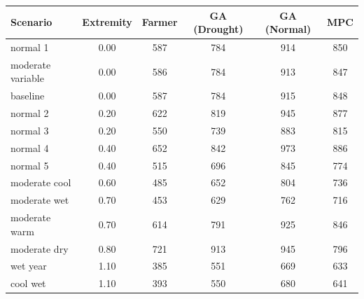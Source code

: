 \documentclass[preprint,12pt]{elsarticle}
\begin{document}

\begin{table}[ht]
\centering
\small
\begin{tabular}{|l|c|c|c|c|c|}
\hline
Scenario & Extremity & Farmer & GA (Drought) & GA (Normal) & MPC \\
\hline\hline
normal 1             & 0.00 & \cellcolor{c2}587 & \cellcolor{c4}784 & \cellcolor{c6}914 & \cellcolor{c5}850 \\
moderate variable    & 0.00 & \cellcolor{c2}586 & \cellcolor{c4}784 & \cellcolor{c6}913 & \cellcolor{c5}847 \\
baseline             & 0.00 & \cellcolor{c2}587 & \cellcolor{c4}784 & \cellcolor{c6}915 & \cellcolor{c5}848 \\
normal 2             & 0.20 & \cellcolor{c3}622 & \cellcolor{c5}819 & \cellcolor{c6}945 & \cellcolor{c5}877 \\
normal 3             & 0.20 & \cellcolor{c2}550 & \cellcolor{c4}739 & \cellcolor{c5}883 & \cellcolor{c5}815 \\
normal 4             & 0.40 & \cellcolor{c3}652 & \cellcolor{c5}842 & \cellcolor{c6}973 & \cellcolor{c5}886 \\
normal 5             & 0.40 & \cellcolor{c2}515 & \cellcolor{c3}696 & \cellcolor{c5}845 & \cellcolor{c4}774 \\
moderate cool        & 0.60 & \cellcolor{c1}485 & \cellcolor{c3}652 & \cellcolor{c5}804 & \cellcolor{c4}736 \\
moderate wet         & 0.70 & \cellcolor{c1}453 & \cellcolor{c3}629 & \cellcolor{c4}762 & \cellcolor{c4}716 \\
moderate warm        & 0.70 & \cellcolor{c3}614 & \cellcolor{c4}791 & \cellcolor{c6}925 & \cellcolor{c5}846 \\
moderate dry         & 0.80 & \cellcolor{c4}721 & \cellcolor{c6}913 & \cellcolor{c6}945 & \cellcolor{c4}796 \\
wet year             & 1.10 & \cellcolor{c1}385 & \cellcolor{c2}551 & \cellcolor{c3}669 & \cellcolor{c3}633 \\
cool wet             & 1.10 & \cellcolor{c1}393 & \cellcolor{c2}550 & \cellcolor{c3}680 & \cellcolor{c3}641 \\

\end{tabular}
\end{table}
\end{document}
